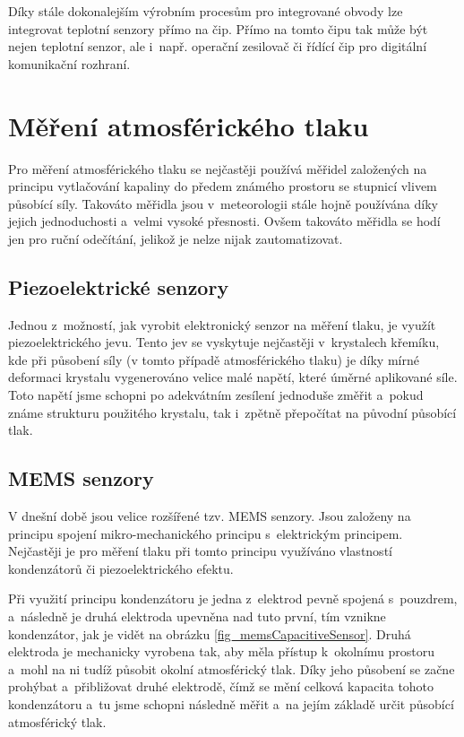 Díky stále dokonalejším výrobním procesům pro integrované obvody lze integrovat teplotní senzory přímo na čip. Přímo na tomto čipu tak může být nejen teplotní senzor, ale i~např. operační zesilovač či řídící čip pro digitální komunikační rozhraní.

\section{Měření atmosférického tlaku}

Pro měření atmosférického tlaku se nejčastěji používá měřidel založených na principu vytlačování kapaliny do předem známého prostoru se stupnicí vlivem působící síly. Takováto měřidla jsou v~meteorologii stále hojně používána díky jejich jednoduchosti a~velmi vysoké přesnosti. Ovšem takováto měřidla se hodí jen pro ruční odečítání, jelikož je nelze nijak zautomatizovat.

\subsection{Piezoelektrické senzory}

Jednou z~možností, jak vyrobit elektronický senzor na měření tlaku, je využít piezoelektrického jevu. Tento jev se vyskytuje nejčastěji v~krystalech křemíku, kde při působení síly (v tomto případě atmosférického tlaku) je díky mírné deformaci krystalu vygenerováno velice malé napětí, které úměrné aplikované síle. Toto napětí jsme schopni po adekvátním zesílení jednoduše změřit a~pokud známe strukturu použitého krystalu, tak i~zpětně přepočítat na původní působící tlak.

\subsection{MEMS senzory}

V dnešní době jsou velice rozšířené tzv. MEMS senzory. Jsou založeny na principu spojení mikro-mechanického principu s~elektrickým principem. Nejčastěji je pro měření tlaku při tomto principu využíváno vlastností kondenzátorů či piezoelektrického efektu.

Při využití principu kondenzátoru je jedna z~elektrod pevně spojená s~pouzdrem, a~následně je druhá elektroda upevněna nad tuto první, tím vznikne kondenzátor, jak je vidět na obrázku \ref{fig_memsCapacitiveSensor}. Druhá elektroda je mechanicky vyrobena tak, aby měla přístup k~okolnímu prostoru a~mohl na ni tudíž působit okolní atmosférický tlak. Díky jeho působení se začne prohýbat a~přibližovat druhé elektrodě, čímž se mění celková kapacita tohoto kondenzátoru a~tu jsme schopni následně měřit a~na jejím základě určit působící atmosférický tlak.

